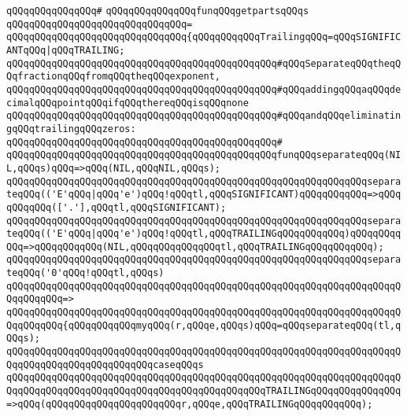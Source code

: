 \verb|qQQqqQQqqQQqqQQq#|\newline
\verb|qQQqqQQqqQQqqQQqfunqQQqgetpartsqQQqs|\newline
\verb|qQQqqQQqqQQqqQQqqQQqqQQqqQQqqQQq=|\newline
\verb|qQQqqQQqqQQqqQQqqQQqqQQqqQQqqQQq{qQQqqQQqqQQqTrailingqQQq=qQQqSIGNIFICANTqQQq|\verb#|qQQqTRAILING;#\newline
\newline
\verb|qQQqqQQqqQQqqQQqqQQqqQQqqQQqqQQqqQQqqQQqqQQqqQQq#qQQqSeparateqQQqtheqQQqfractionqQQqfromqQQqtheqQQqexponent,|\newline
\verb|qQQqqQQqqQQqqQQqqQQqqQQqqQQqqQQqqQQqqQQqqQQqqQQq#qQQqaddingqQQqaqQQqdecimalqQQqpointqQQqifqQQqthereqQQqisqQQqnone|\newline
\verb|qQQqqQQqqQQqqQQqqQQqqQQqqQQqqQQqqQQqqQQqqQQqqQQq#qQQqandqQQqeliminatingqQQqtrailingqQQqzeros:|\newline
\verb|qQQqqQQqqQQqqQQqqQQqqQQqqQQqqQQqqQQqqQQqqQQqqQQq#|\newline
\verb|qQQqqQQqqQQqqQQqqQQqqQQqqQQqqQQqqQQqqQQqqQQqqQQqfunqQQqseparateqQQq(NIL,qQQqs)qQQq=>qQQq(NIL,qQQqNIL,qQQqs);|\newline
\newline
\verb|qQQqqQQqqQQqqQQqqQQqqQQqqQQqqQQqqQQqqQQqqQQqqQQqqQQqqQQqqQQqqQQqseparateqQQq(('E'qQQq|\verb#|qQQq'e')qQQq!qQQqtl,qQQqSIGNIFICANT)qQQqqQQqqQQq=>qQQqqQQqqQQq(['.'],qQQqtl,qQQqSIGNIFICANT);#\newline
\verb|qQQqqQQqqQQqqQQqqQQqqQQqqQQqqQQqqQQqqQQqqQQqqQQqqQQqqQQqqQQqqQQqseparateqQQq(('E'qQQq|\verb#|qQQq'e')qQQq!qQQqtl,qQQqTRAILINGqQQqqQQqqQQq)qQQqqQQqqQQq=>qQQqqQQqqQQq(NIL,qQQqqQQqqQQqqQQqtl,qQQqTRAILINGqQQqqQQqqQQq);#\newline
\newline
\verb|qQQqqQQqqQQqqQQqqQQqqQQqqQQqqQQqqQQqqQQqqQQqqQQqqQQqqQQqqQQqqQQqseparateqQQq('0'qQQq!qQQqtl,qQQqs)|\newline
\verb|qQQqqQQqqQQqqQQqqQQqqQQqqQQqqQQqqQQqqQQqqQQqqQQqqQQqqQQqqQQqqQQqqQQqqQQqqQQqqQQq=>|\newline
\verb|qQQqqQQqqQQqqQQqqQQqqQQqqQQqqQQqqQQqqQQqqQQqqQQqqQQqqQQqqQQqqQQqqQQqqQQqqQQqqQQq{qQQqqQQqqQQqmyqQQq(r,qQQqe,qQQqs)qQQq=qQQqseparateqQQq(tl,qQQqs);|\newline
\newline
\verb|qQQqqQQqqQQqqQQqqQQqqQQqqQQqqQQqqQQqqQQqqQQqqQQqqQQqqQQqqQQqqQQqqQQqqQQqqQQqqQQqqQQqqQQqqQQqqQQqcaseqQQqs|\newline
\verb|qQQqqQQqqQQqqQQqqQQqqQQqqQQqqQQqqQQqqQQqqQQqqQQqqQQqqQQqqQQqqQQqqQQqqQQqqQQqqQQqqQQqqQQqqQQqqQQqqQQqqQQqqQQqqQQqqQQqTRAILINGqQQqqQQqqQQqqQQq=>qQQq(qQQqqQQqqQQqqQQqqQQqqQQqr,qQQqe,qQQqTRAILINGqQQqqQQqqQQq);|\newline
